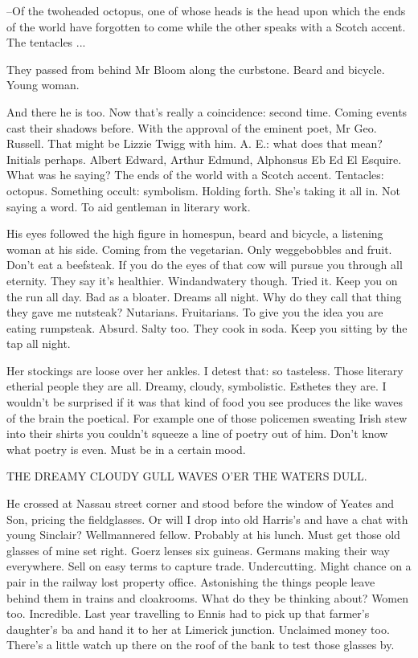 --Of the twoheaded octopus, one of whose heads is the head upon which
the ends of the world have forgotten to come while the other speaks with a
Scotch accent. The tentacles ...

They passed from behind Mr Bloom along the curbstone. Beard and
bicycle. Young woman.

And there he is too. Now that's really a coincidence: second time.
Coming events cast their shadows before. With the approval of the eminent
poet, Mr Geo. Russell. That might be Lizzie Twigg with him. A. E.: what
does that mean? Initials perhaps. Albert Edward, Arthur Edmund,
Alphonsus Eb Ed El Esquire. What was he saying? The ends of the world
with a Scotch accent. Tentacles: octopus. Something occult: symbolism.
Holding forth. She's taking it all in. Not saying a word. To aid gentleman
in literary work.

His eyes followed the high figure in homespun, beard and bicycle, a
listening woman at his side. Coming from the vegetarian. Only
weggebobbles and fruit. Don't eat a beefsteak. If you do the eyes of that
cow will pursue you through all eternity. They say it's healthier.
Windandwatery though. Tried it. Keep you on the run all day. Bad as a
bloater. Dreams all night. Why do they call that thing they gave me
nutsteak? Nutarians. Fruitarians. To give you the idea you are eating
rumpsteak. Absurd. Salty too. They cook in soda. Keep you sitting by the
tap all night.

Her stockings are loose over her ankles. I detest that: so tasteless.
Those literary etherial people they are all. Dreamy, cloudy, symbolistic.
Esthetes they are. I wouldn't be surprised if it was that kind of food you
see produces the like waves of the brain the poetical. For example one of
those policemen sweating Irish stew into their shirts you couldn't squeeze
a line of poetry out of him. Don't know what poetry is even. Must be in a
certain mood.


    THE DREAMY CLOUDY GULL
    WAVES O'ER THE WATERS DULL.


He crossed at Nassau street corner and stood before the window of
Yeates and Son, pricing the fieldglasses. Or will I drop into old Harris's
and have a chat with young Sinclair? Wellmannered fellow. Probably at his
lunch. Must get those old glasses of mine set right. Goerz lenses six
guineas. Germans making their way everywhere. Sell on easy terms to
capture trade. Undercutting. Might chance on a pair in the railway lost
property office. Astonishing the things people leave behind them in trains
and cloakrooms. What do they be thinking about? Women too. Incredible.
Last year travelling to Ennis had to pick up that farmer's daughter's ba
 and hand it to her at Limerick junction. Unclaimed money too. There's a
little watch up there on the roof of the bank to test those glasses by.


